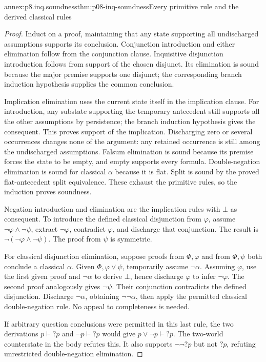 \begin{annexitem}{annex:p8.inq.soundness}{thm:p08-inq-soundness}{Every primitive rule and the derived classical rules}
\begin{proof}
Induct on a proof, maintaining that any state supporting all undischarged
assumptions supports its conclusion. Conjunction introduction and either
elimination follow from the conjunction clause. Inquisitive disjunction
introduction follows from support of the chosen disjunct. Its elimination
is sound because the major premise supports one disjunct; the corresponding
branch induction hypothesis supplies the common conclusion.

Implication elimination uses the current state itself in the implication
clause. For introduction, any substate supporting the temporary antecedent
still supports all the other assumptions by persistence; the branch
induction hypothesis gives the consequent. This proves support of the
implication. Discharging zero or several occurrences changes none of the
argument: any retained occurrence is still among the undischarged assumptions.
Falsum elimination is sound because its premise forces the state to be
empty, and empty supports every formula. Double-negation elimination is
sound for classical \(\alpha\) because it is flat. Split is sound by
the proved flat-antecedent split equivalence. These exhaust the primitive
rules, so the induction proves soundness.

Negation introduction and elimination are the implication rules with
\(\bot\) as consequent. To introduce the defined classical disjunction
from \(\varphi\), assume \(\neg\varphi\land\neg\psi\), extract
\(\neg\varphi\), contradict \(\varphi\), and discharge that conjunction.
The result is \(\neg(\neg\varphi\land\neg\psi)\). The proof from
\(\psi\) is symmetric.

For classical disjunction elimination, suppose proofs from \(\Phi,\varphi\)
and from \(\Phi,\psi\) both conclude a classical \(\alpha\).
Given \(\Phi,\varphi\lor\psi\), temporarily assume \(\neg\alpha\).
Assuming \(\varphi\), use the first given proof and \(\neg\alpha\)
to derive \(\bot\), hence discharge \(\varphi\) to infer
\(\neg\varphi\). The second proof analogously gives \(\neg\psi\).
Their conjunction contradicts the defined disjunction. Discharge
\(\neg\alpha\), obtaining \(\neg\neg\alpha\), then apply the permitted
classical double-negation rule. No appeal to completeness is needed.

If arbitrary question conclusions were permitted in this last rule, the
two derivations \(p\vdash?p\) and \(\neg p\vdash?p\) would give
\(p\lor\neg p\vdash?p\). The two-world counterstate in the body
refutes this. It also supports \(\neg\neg?p\) but not \(?p\), refuting
unrestricted double-negation elimination.
\end{proof}
\end{annexitem}

